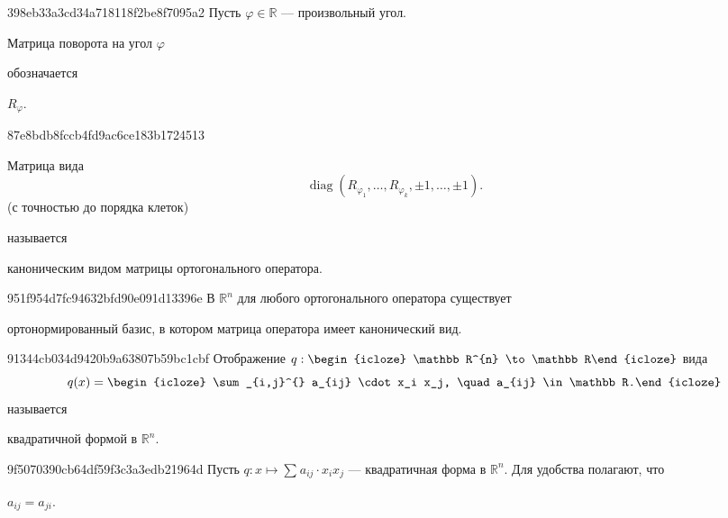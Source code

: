 \begin{note}{398eb33a3cd34a718118f2be8f7095a2}
    Пусть \({ \varphi \in \mathbb R }\) --- произвольный угол.
    \begin{icloze}{1}Матрица поворота на угол \({ \varphi }\)\end{icloze} обозначается \begin{icloze}{2}\({ R_{\varphi} }\).\end{icloze}
\end{note}

\begin{note}{87e8bdb8fccb4fd9ac6ce183b1724513}
    \begin{icloze}{1}
        Матрица вида
        \[
            \operatorname{diag}(R_{\varphi_1}, \ldots, R_{\varphi_k}, \pm 1, \ldots, \pm 1).
        \]
    (с точностью до порядка клеток)
    \end{icloze}
    называется \begin{icloze}{2}каноническим видом матрицы ортогонального оператора.\end{icloze}
\end{note}

\begin{note}{951f954d7fc94632bfd90e091d13396e}
    В \({ \mathbb R^{n} }\) для любого ортогонального оператора существует \begin{icloze}{1}ортонормированный базис, в котором матрица оператора имеет канонический вид.\end{icloze}
\end{note}

\begin{note}{91344cb034d9420b9a63807b59bc1cbf}
    Отображение \({ q : \begin{icloze}{1}\mathbb R^{n} \to \mathbb R\end{icloze} }\) вида
    \[
        q(x) = \begin{icloze}{2}\sum_{i,j}^{} a_{ij} \cdot x_i x_j, \quad a_{ij} \in \mathbb R.\end{icloze}
    \]
    называется \begin{icloze}{3}квадратичной формой в \({ \mathbb R^{n} }\).\end{icloze}
\end{note}

\begin{note}{9f5070390cb64df59f3c3a3edb21964d}
    Пусть \({ q : x \mapsto  \sum_{}^{} a_{ij} \cdot x_i x_j }\) --- квадратичная форма в \({ \mathbb R^{n} }\).
    Для удобства полагают, что \begin{icloze}{1}\({ a_{ij} = a_{ji} }\).\end{icloze}
\end{note}

